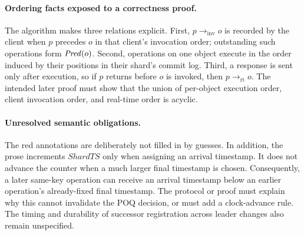 \paragraph{Ordering facts exposed to a correctness proof.}
The algorithm makes three relations explicit.  First,
$p\rightarrow_{\mathrm{inv}}o$ is recorded by the client when $p$ precedes
$o$ in that client's invocation order; outstanding such operations form
$\mathit{Pred}(o)$.  Second, operations on one object execute in the order induced by
their positions in their shard's commit log.  Third, a response is sent only
after execution, so if $p$ returns before $o$ is invoked, then
$p\rightarrow_{\mathrm{rt}}o$.  The intended later proof must show that the
union of per-object execution order, client invocation order, and real-time
order is acyclic.

\paragraph{Unresolved semantic obligations.}
The red annotations are deliberately not filled in by guesses.  In addition,
the prose increments $\mathit{ShardTS}$ only when assigning an arrival
timestamp.  It does not advance the counter when a much larger final timestamp
is chosen.  Consequently, a later same-key operation can receive an arrival
timestamp below an earlier operation's already-fixed final timestamp.  The
protocol or proof must explain why this cannot invalidate the POQ decision, or
must add a clock-advance rule.  The timing and durability of successor
registration across leader changes also remain unspecified.

